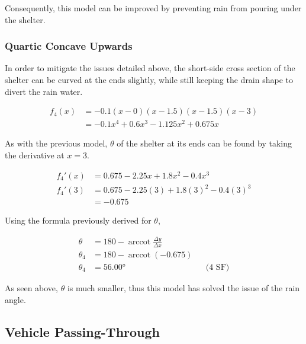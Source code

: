 \documentclass[a4paper,titlepage]{article}
\DeclareMathOperator{\arccot}{arccot}
\begin{document}
Consequently, this model can be improved by preventing rain from pouring under the shelter.

\subsubsection{Quartic Concave Upwards}

In order to mitigate the issues detailed above, the short-side cross section of the shelter can be curved at the ends slightly, while still keeping the drain shape to divert the rain water.

\begin{align}
    f_4(x)&=-0.1(x-0)(x-1.5)(x-1.5)(x-3)\\
    &=-0.1x^4+0.6x^3-1.125x^2+0.675x
\end{align}


As with the previous model, $\theta$ of the shelter at its ends can be found by taking the derivative at $x=3$.

\begin{align}
    {f_4}'(x)&=0.675-2.25x+1.8x^2-0.4x^3\\
    {f_4}'(3)&=0.675-2.25(3)+1.8(3)^2-0.4(3)^3\\
    &=-0.675
\end{align}

Using the formula previously derived for $\theta$,

\begin{align}
    \theta&=180-\arccot\frac{\Delta y}{\Delta x}\\
    \theta_4&=180-\arccot(-0.675)\\
    \theta_4&=56.00\si{\degree}&&\text{(4 SF)}
\end{align}

As seen above, $\theta$ is much smaller, thus this model has solved the issue of the rain angle.

\subsection{Vehicle Passing-Through}\label{sec:Mathematical Model:Vehicle Passing-Through}
\end{document}

